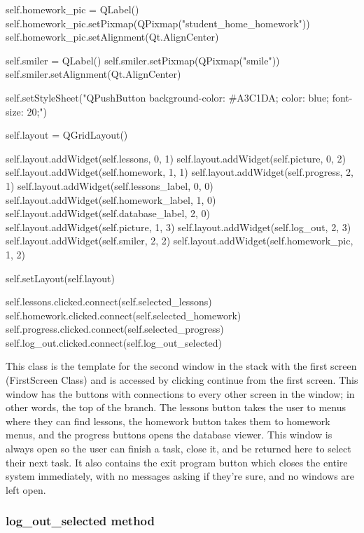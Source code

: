 \begin{python}
        self.homework_pic = QLabel()
        self.homework_pic.setPixmap(QPixmap("student_home_homework"))
        self.homework_pic.setAlignment(Qt.AlignCenter)  
        
        self.smiler = QLabel()
        self.smiler.setPixmap(QPixmap("smile"))
        self.smiler.setAlignment(Qt.AlignCenter)

        self.setStyleSheet("QPushButton {background-color: #A3C1DA; color: blue; font-size: 20;}")

        self.layout = QGridLayout()

        self.layout.addWidget(self.lessons, 0, 1)
        self.layout.addWidget(self.picture, 0, 2)
        self.layout.addWidget(self.homework, 1, 1)
        self.layout.addWidget(self.progress, 2, 1)
        self.layout.addWidget(self.lessons_label, 0, 0)
        self.layout.addWidget(self.homework_label, 1, 0)
        self.layout.addWidget(self.database_label, 2, 0)
        self.layout.addWidget(self.picture, 1, 3)
        self.layout.addWidget(self.log_out, 2, 3)
        self.layout.addWidget(self.smiler, 2, 2)
        self.layout.addWidget(self.homework_pic, 1, 2)

        self.setLayout(self.layout)

        self.lessons.clicked.connect(self.selected_lessons)
        self.homework.clicked.connect(self.selected_homework)
        self.progress.clicked.connect(self.selected_progress)
        self.log_out.clicked.connect(self.log_out_selected)
\end{python}

This class is the template for the second window in the stack with the first screen (FirstScreen Class) and is accessed by clicking continue from the first screen. This window has the buttons with connections to every other screen in the window; in other words, the top of the branch. The lessons button takes the user to menus where they can find lessons, the homework button takes them to homework menus, and the progress buttons opens the database viewer. This window is always open so the user can finish a task, close it, and be returned here to select their next task. It also contains the exit program button which closes the entire system immediately, with no messages asking if they're sure, and no windows are left open.

\subsubsection{log\_out\_selected method}

